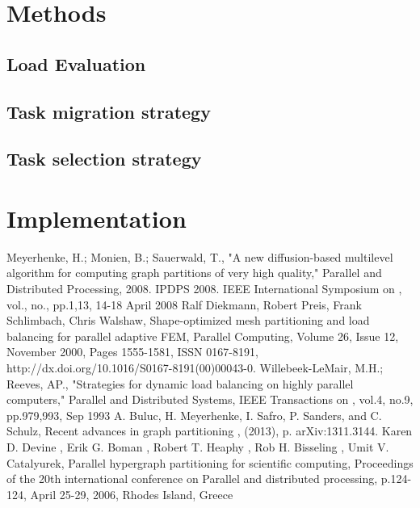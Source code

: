 \documentclass{thesis}
\begin{document}
\chapter{Methods}

\section {Load Evaluation}

\section{Task migration strategy}

\section{Task selection strategy}


\chapter{Implementation}
\begin{singlespace}
\begin{thebibliography}{99}
 Meyerhenke, H.; Monien, B.; Sauerwald, T., "A new diffusion-based multilevel algorithm for computing graph partitions of very high quality," Parallel and Distributed Processing, 2008. IPDPS 2008. IEEE International Symposium on , vol., no., pp.1,13, 14-18 April 2008
 Ralf Diekmann, Robert Preis, Frank Schlimbach, Chris Walshaw, Shape-optimized mesh partitioning and load balancing for parallel adaptive FEM, Parallel Computing, Volume 26, Issue 12, November 2000, Pages 1555-1581, ISSN 0167-8191, http://dx.doi.org/10.1016/S0167-8191(00)00043-0.
 Willebeek-LeMair, M.H.; Reeves, AP., "Strategies for dynamic load balancing on highly parallel computers," Parallel and Distributed Systems, IEEE Transactions on , vol.4, no.9, pp.979,993, Sep 1993
 A. Buluc, H. Meyerhenke, I. Safro, P. Sanders, and C. Schulz, Recent advances in graph partitioning , (2013), p. arXiv:1311.3144.
  Karen D. Devine , Erik G. Boman , Robert T. Heaphy , Rob H. Bisseling , Umit V. Catalyurek, Parallel hypergraph partitioning for scientific computing, Proceedings of the 20th international conference on Parallel and distributed processing, p.124-124, April 25-29, 2006, Rhodes Island, Greece 
\end{thebibliography}
\end{singlespace}
\end{document}
